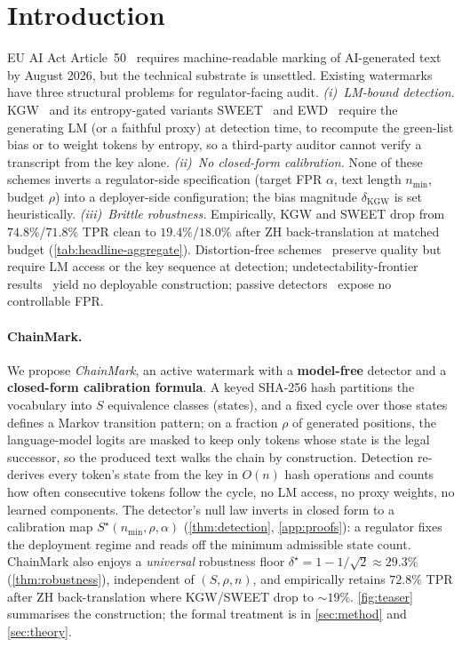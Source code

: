 \section{Introduction}
\label{sec:intro}

EU AI Act Article~50~\citep{euaiact2024} requires machine-readable
marking of AI-generated text by August 2026, but the technical
substrate is unsettled. Existing watermarks have three structural
problems for regulator-facing audit. \emph{(i)~LM-bound detection.}
KGW~\citep{kirchenbauer2023watermark} and its entropy-gated variants
SWEET~\citep{lee2023sweet} and EWD~\citep{lu2024ewd} require the
generating LM (or a faithful proxy) at detection time, to
recompute the green-list bias or to weight tokens by entropy, so
a third-party auditor cannot verify a transcript from the key alone.
\emph{(ii)~No closed-form calibration.} None of these schemes
inverts a regulator-side specification (target FPR $\alpha$, text
length $n_{\min}$, budget $\rho$) into a deployer-side configuration;
the bias magnitude $\delta_{\mathrm{KGW}}$ is set heuristically.
\emph{(iii)~Brittle robustness.} Empirically, KGW and SWEET drop
from $74.8\%$/$71.8\%$ TPR clean to $19.4\%$/$18.0\%$ after
ZH back-translation at matched budget (\autoref{tab:headline-aggregate}).
Distortion-free schemes~\citep{aaronson2023semstamp,kuditipudi2023robust}
preserve quality but require LM access or the key sequence at
detection; undetectability-frontier results~\citep{christ2024undetectable}
yield no deployable construction; passive
detectors~\citep{mitchell2023detectgpt,tian2023gptzero} expose no
controllable FPR.

\paragraph{ChainMark.}
We propose \emph{ChainMark}, an active watermark with a
\textbf{model-free} detector and a \textbf{closed-form calibration
formula}. A keyed SHA-256 hash partitions the vocabulary into $S$
equivalence classes (states), and a fixed cycle over those states
defines a Markov transition pattern; on a fraction $\rho$ of
generated positions, the language-model logits are masked to keep
only tokens whose state is the legal successor, so the produced
text walks the chain by construction. Detection re-derives every
token's state from the key in $O(n)$ hash operations and counts how
often consecutive tokens follow the cycle, no LM access, no proxy
weights, no learned components. The detector's null law inverts in
closed form to a calibration map
$S^\star(n_{\min}, \rho, \alpha)$ (\autoref{thm:detection},
\autoref{app:proofs}): a regulator fixes the deployment regime and
reads off the minimum admissible state count. ChainMark also enjoys a
\emph{universal} robustness floor $\delta^\star = 1 - 1/\sqrt{2}
\approx 29.3\%$ (\autoref{thm:robustness}), independent of
$(S, \rho, n)$, and empirically retains $72.8\%$ TPR after ZH
back-translation where KGW/SWEET drop to $\sim\!\!19\%$.
\autoref{fig:teaser} summarises the construction; the formal
treatment is in \autoref{sec:method} and \autoref{sec:theory}.

